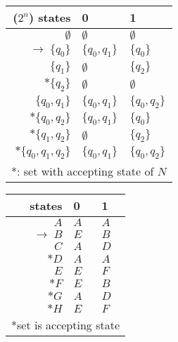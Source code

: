 \begin{minipage}{.6\linewidth}
  \centering
  \begin{tabular}{r||l|l}
    ($2^{n}$) states & 0 & 1 \\
    \hline
    \hline
    $\emptyset$ & $\emptyset$ & $\emptyset$ \\
    $\to\; \{q_{0}\}$    & $\{q_{0},q_{1}\}$ & $\{q_{0}\}$\\
    $\{q_{1}\}$          & $\emptyset$      & $\{q_{2}\}$\\
    $*\{q_{2}\}$         & $\emptyset$      & $\emptyset$\\
    $\{q_{0},q_{1}\}$ & $\{q_{0},q_{1}\}$ & $\{q_{0},q_{2}\}$\\
    $*\{q_{0},q_{2}\}$ & $\{q_{0},q_{1}\}$ & $\{q_{0}\}$\\
    $*\{q_{1},q_{2}\}$ & $\emptyset$ & $\{q_{2}\}$\\
    $*\{q_{0},q_{1},q_{2}\}$ & $\{q_{0},q_{1}\}$ & $\{q_{0},q_{2}\}$\\
    \hline
    \hline
    \multicolumn{3}{l}{*: set with accepting state of $N$}
  \end{tabular}
\end{minipage}
\begin{minipage}{.4\linewidth}
  \begin{tabular}{r||l|l}
    states & 0 & 1 \\
    \hline
    \hline
    $A$ & $A$ & $A$ \\
    $\to\;B$  & $E$ & $B$\\
    $C$       & $A$ & $D$\\
    $*D$      & $A$ & $A$\\
    $E$       & $E$ & $F$\\
    $*F$      & $E$ & $B$\\
    $*G$      & $A$ & $D$\\
    $*H$    & $E$ & $F$\\
    \hline
    \hline
    \multicolumn{3}{l}{*set is accepting state}
  \end{tabular}
\end{minipage}
